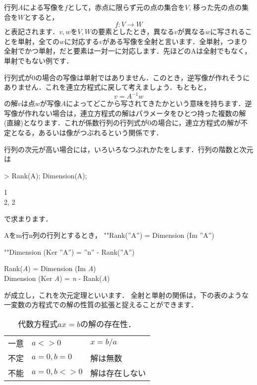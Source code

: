 行列$A$による写像を$f$として，赤点に限らず元の点の集合を$V$, 移った先の点の集合を$W$とすると，
\begin{equation*}
f: V \rightarrow W
\end{equation*}
と表記されます．$v,w$を$V,W$の要素としたとき，異なる$v$が異なる$w$に写されることを単射，全ての$w$に対応する$v$がある写像を全射と言います．全単射，つまり全射でかつ単射，だと要素は一対一に対応します．先ほどのAは全射でもなく，単射でもない例です．

行列式が0の場合の写像は単射ではありません．このとき，逆写像が作れそうにありません．これを連立方程式に戻して考えましょう．もともと，
\begin{equation*}
v = A^{-1} w
\end{equation*}
の解$v$は点$w$が写像$A$によってどこから写されてきたかという意味を持ちます．逆写像が作れない場合は，連立方程式の解はパラメータをひとつ持った複数の解(直線)となります．これが係数行列の行列式が0の場合に，連立方程式の解が不定となる，あるいは像がつぶれるという関係です．

行列の次元が高い場合には，いろいろなつぶれかたをします．行列の階数と次元は
\begin{MapleInput}
> Rank(A); 
  Dimension(A);
\end{MapleInput}
\begin{MapleOutputGather}
1 \notag \\
2, 2 \notag
\end{MapleOutputGather}
で求まります．

Aをm行n列の行列とするとき，
\ifHIKI
""Rank(''A'') = Dimension (Im ''A'')

""Dimension (Ker ''A'') = ''n'' - Rank(''A'') 

\else

\begin{center}
Rank({\it A}) = Dimension (Im {\it A}) \\
Dimension ({\rm Ker} {\it A}) = {\it n} - Rank({\it A}) 
\end{center}

\fi
が成立し，これを次元定理といいます．
全射と単射の関係は，下の表のような一変数の方程式での解の性質の拡張と捉えることができます．

\begin{table}[htbp]
\caption{代数方程式$a x =b$の解の存在性．}
\begin{center}
\begin{tabular}{|c|l|l|}
\hline
一意&$a<>0$ &$x=b/a$ \\
不定&$a=0, b=0$ &解は無数\\ 
不能&$a=0, b<>0$ &解は存在しない\\
\hline
\end{tabular}
\end{center}
\label{default}
\end{table}%

